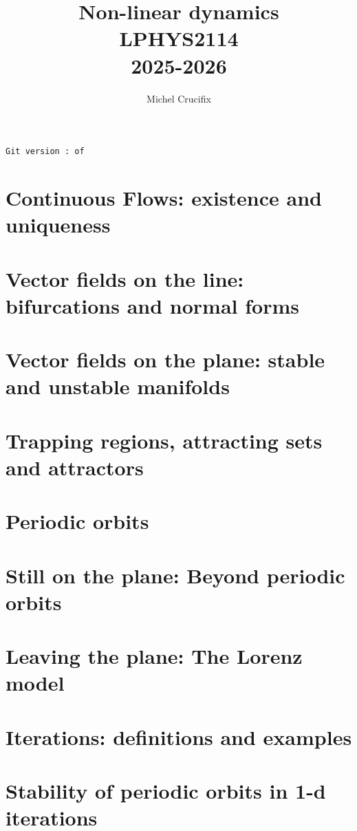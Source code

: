 \documentclass[fleqn,twoside]{mc}
\title{Non-linear dynamics \\ LPHYS2114 \\ 2025-2026}
\author{Michel Crucifix}
\begin{document}
\titlepage
\tableofcontents
\texttt{Git version \gitbranch:\gitrevision \ of \gitdate}

\section{Continuous Flows: existence and uniqueness}


\section{Vector fields on the line: bifurcations and normal forms}


\section{Vector fields on the plane: stable and unstable manifolds}

\section{Trapping regions,  attracting sets and attractors}


\section{Periodic orbits}



 \section{Still on the plane: Beyond periodic orbits }


 
 \section{Leaving the plane: The Lorenz model }
 



\section{Iterations: definitions and examples}


\section{Stability of periodic orbits in 1-d iterations}

\end{document}
